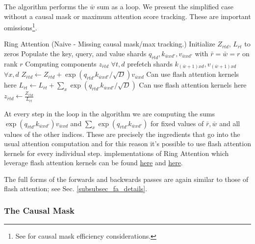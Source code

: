 The algorithm performs the $ \bar{w}$ sum as a loop. We present the simplified case without a causal
mask or maximum attention score tracking. These are important omissions\footnote{See
\cite{brandon2023stripedattentionfasterring} for causal mask efficiency considerations.}.
\begin{algo}{Ring Attention (Naive - Missing causal mask/max tracking.)}
\State Initialize $ Z _{ \bar{r}td } $, $ L _{ \bar{r}t } $ to zeros
\State Populate the key, query, and value shards $ q _{ \bar{r}td },k _{ \bar{w}x d' },v _{ \bar{w}x d' } $ with $ \bar{r} =  \bar{w} = r $ on rank $ r $
 \Comment Computing components $ z _{ \bar{r}td } $ $ \forall t, d $
     prefetch shards $ k _{ (\bar{w}+1)xd }, v _{ (\bar{w}+1)xd } $ $ \forall x,d $
    \EndIf
    \State $ Z _{ \bar{r}td } \gets Z _{ \bar{r}td }+   \exp \left ( q _{ \bar{r}t d' } k _{ \bar{w}x d' }/\sqrt{D} \right ) v _{ \bar{w}xd } $ \Comment Can use flash attention kernels here
    \State $ L _{ \bar{r}t } \gets  L _{ \bar{r}t } +  \sum _{ x } \exp \left ( q _{ \bar{r}t d' } k _{ \bar{w}x d' }/\sqrt{D}\right )  $ \Comment Can use flash attention kernels here
\EndFor
\State $ z _{ \bar{r}td } \gets \frac{ Z _{ \bar{r}td } }{ L _{ \bar{r}t }  }$
\label{algo_ring_attn_fwd_naive}
\end{algo}

At every step in the loop in the algorithm we are computing the sums $ \exp \left ( q _{ \bar{r}t d'
} k _{ \bar{w}x d' } \right ) v _{ \bar{w}xd } $ and $ \sum _{ x } \exp \left ( q _{ \bar{r}t d' } k
_{ \bar{w}x d' } \right)  $ for fixed values of $ \bar{r}, \bar{w} $ and all values of the other
indices. These are precisely the ingredients that go into the usual attention computation and for
this reason it's possible to use flash attention kernels for every individual step. 
implementations of Ring Attention which leverage flash attention kernels can be found
\href{https://github.com/lucidrains/ring-attention-pytorch}{here} and
\href{https://github.com/zhuzilin/ring-flash-attention}{here}.

The full forms of the forwards and backwards passes are again similar to those of flash attention; see Sec. \ref{subsubsec_fa_details}.

\subsubsection{The Causal Mask}

